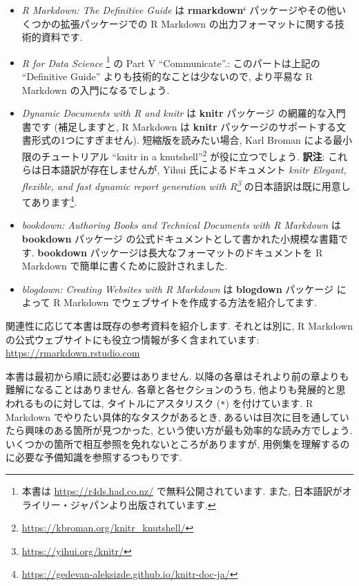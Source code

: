 \documentclass[
  11pt,
]{bxjsreport}
\renewcommand{\href}[2]{#2\footnote{\url{#1}}}
\begin{document}
\begin{itemize}
\item
  \emph{R Markdown: The Definitive Guide} \autocite{rmarkdown2018} は \textbf{rmarkdown`} パッケージやその他いくつかの拡張パッケージでの R Markdown の出力フォーマットに関する技術的資料です.
\item
  \emph{R for Data Science} \autocite{wickham2016Data}\footnote{本書は \url{https://r4ds.had.co.nz/} で無料公開されています. また, 日本語訳がオライリー・ジャパンより出版されています.} の Part V ``Communicate''.: このパートは上記の ``Definitive Guide'' よりも技術的なことは少ないので, より平易な R Markdown の入門になるでしょう.
\item
  \emph{Dynamic Documents with R and knitr} \autocite{knitr2015} は \textbf{knitr} パッケージ \autocite{R-knitr} の網羅的な入門書です (補足しますと, R Markdown は \textbf{knitr} パッケージのサポートする文書形式の1つにすぎません). 短縮版を読みたい場合, Karl Broman による最小限のチュートリアル \href{https://kbroman.org/knitr_knutshell/}{``knitr in a knutshell''} が役に立つでしょう. \textbf{訳注}: これらは日本語訳が存在しませんが, Yihui 氏によるドキュメント \emph{\href{https://yihui.org/knitr/}{knitr Elegant, flexible, and fast dynamic report generation with R}} の日本語訳は既に用意してあります\footnote{\url{https://gedevan-aleksizde.github.io/knitr-doc-ja/}}.
\item
  \emph{bookdown: Authoring Books and Technical Documents with R Markdown} \autocite{bookdown2016} は \textbf{bookdown} パッケージ \autocite{R-bookdown} の公式ドキュメントとして書かれた小規模な書籍です. \textbf{bookdown} パッケージは長大なフォーマットのドキュメントを R Markdown で簡単に書くために設計されました.
\item
  \emph{blogdown: Creating Websites with R Markdown} \autocite{blogdown2017} は \textbf{blogdown} パッケージ \autocite{R-blogdown} によって R Markdown でウェブサイトを作成する方法を紹介してます.
\end{itemize}

関連性に応じて本書は既存の参考資料を紹介します. それとは別に, R Markdown の公式ウェブサイトにも役立つ情報が多く含まれています: \url{https://rmarkdown.rstudio.com}

本書は最初から順に読む必要はありません. 以降の各章はそれより前の章よりも難解になることはありません. 各章と各セクションのうち, 他よりも発展的と思われるものに対しては, タイトルにアスタリスク (\texttt{*}) を付けています. R Markdown でやりたい具体的なタスクがあるとき, あるいは目次に目を通していたら興味のある箇所が見つかった, という使い方が最も効率的な読み方でしょう. いくつかの箇所で相互参照を免れないところがありますが, 用例集を理解するのに必要な予備知識を参照するつもりです.
\end{document}

